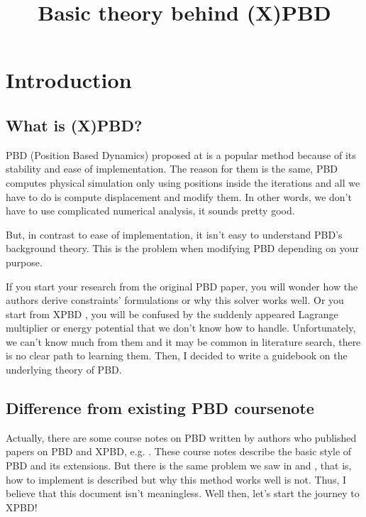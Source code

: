 \documentclass[pdflatex,sn-mathphys-num]{sn-jnl}%
\theoremstyle{thmstyleone}%
\theoremstyle{thmstyletwo}%
\theoremstyle{thmstylethree}%
\begin{document}
	
	\title[Basic theory behind (X)PBD]{Basic theory behind (X)PBD}
	\author*{ }
\maketitle
\tableofcontents
\newpage

\section{Introduction}\label{sec1}
\subsection{What is (X)PBD?}
PBD (Position Based Dynamics) proposed at \cite{PBD} is a popular method because of its stability and ease of implementation. The reason for them is the same, PBD computes physical simulation only using positions inside the \gls{iteration}s and all we have to do is compute displacement and modify them.
In other words, we don't have to use complicated numerical analysis, it sounds pretty good.

But, in contrast to ease of implementation, it isn't easy to understand PBD's background theory. This is the problem when modifying PBD depending on your purpose. 

If you start your research from the original PBD paper\cite{PBD}, you will wonder how the authors derive constraints' formulations or why this solver works well. Or you start from XPBD \cite{XPBD}, you will be confused by the suddenly appeared Lagrange multiplier or energy potential that we don't know how to handle.
Unfortunately, we can't know much from them and it may be common in literature search, there is no clear path to learning them. Then, I decided to write a guidebook on the underlying theory of PBD.

\subsection{Difference from existing PBD coursenote}
Actually, there are some course notes on PBD written by authors who published papers on PBD and XPBD, e.g. \cite{PBDCoursenote}. These course notes describe the basic style of PBD and its extensions. But there is the same problem we saw in \cite{PBD} and \cite{XPBD}, that is, how to implement is described but why this method works well is not. Thus, I believe that this document isn't meaningless. Well then, let's start the journey to XPBD!
\end{document}
